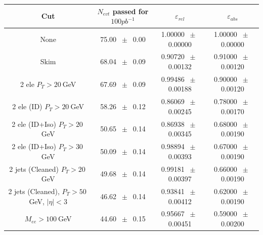 \begin{table}[htbp] 
\begin{center} 
\begin{tabular}{|c|c|c|c|} 
\hline\hline 
 Cut & $N_{evt}$ passed for $100pb^{-1}$ & $\varepsilon_{rel}$ & $\varepsilon_{abs}$ \\ 
\hline\hline 
None          &           75.00          $~\pm~$          0.00           &           1.00000          $~\pm~$          0.00000           &           1.00000          $~\pm~$          0.00000          \\          
          Skim          &           68.04          $~\pm~$          0.09           &           0.90720          $~\pm~$          0.00132           &           0.91000          $~\pm~$          0.00120          \\          
          2 ele $P_T>20~$GeV          &           67.69          $~\pm~$          0.09           &           0.99486          $~\pm~$          0.00188           &           0.90000          $~\pm~$          0.00120          \\          
          2 ele (ID) $P_T>20~$GeV          &           58.26          $~\pm~$          0.12           &           0.86069          $~\pm~$          0.00245           &           0.78000          $~\pm~$          0.00170          \\          
          2 ele (ID+Iso) $P_T>20~$GeV          &           50.65          $~\pm~$          0.14           &           0.86938          $~\pm~$          0.00345           &           0.68000          $~\pm~$          0.00190          \\          
          2 ele (ID+Iso) $P_T>30~$GeV          &           50.09          $~\pm~$          0.14           &           0.98894          $~\pm~$          0.00393           &           0.67000          $~\pm~$          0.00190          \\          
          2 jets (Cleaned) $P_T>20~$GeV          &           49.68          $~\pm~$          0.14           &           0.99181          $~\pm~$          0.00397           &           0.66000          $~\pm~$          0.00190          \\          
          2 jets (Cleaned), $P_T>50~$GeV, $ | \eta |<3$          &           46.62          $~\pm~$          0.14           &           0.93841          $~\pm~$          0.00412           &           0.62000          $~\pm~$          0.00190          \\          
          $M_{ee}>100~$GeV          &           44.60          $~\pm~$          0.15           &           0.95667          $~\pm~$          0.00451           &           0.59000          $~\pm~$          0.00200          \\          

\end{tabular}
\end{center}
\end{table}
